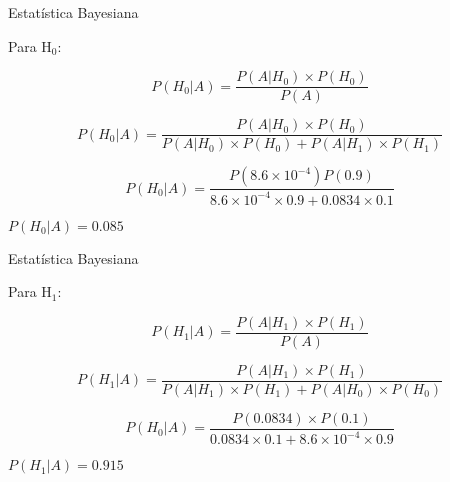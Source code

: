\documentclass{beamer}\usepackage[]{graphicx}\usepackage[]{color}
\begin{document}
\begin{frame}{Estatística Bayesiana}

Para H$_0$:

\begin{equation*}
P(H_0|A) = \frac{P(A|H_0) \times P(H_0)}{P(A)}
\end{equation*}

\begin{equation*}
P(H_0 | A) = \frac{P(A | H_0) \times P(H_0)}{P(A | H_0) \times P(H_0) + P(A | H_1) \times P(H_1)}
\end{equation*}

\begin{equation*}
P(H_0 | A) = \frac{P(\ensuremath{8.6\times 10^{-4}})P(0.9)}{\ensuremath{8.6\times 10^{-4}}\times 0.9 +0.0834 \times 0.1}
\end{equation*}

$P(H_0|A) = 0.085$
 
\end{frame}

\begin{frame}{Estatística Bayesiana}

Para H$_1$:

\begin{equation*}
P(H_1 | A) = \frac{P(A | H_1) \times P(H_1)}{P(A)}
\end{equation*}

\begin{equation*}
P(H_1 | A) = \frac{P(A | H_1) \times P(H_1)}{P(A | H_1) \times P(H_1) + P(A | H_0) \times P(H_0)}
\end{equation*}

\begin{equation*}
P(H_0 | A) = \frac{P(0.0834) \times P(0.1)}{0.0834 \times 0.1 +\ensuremath{8.6\times 10^{-4}} \times 0.9}
\end{equation*}

$P(H_1|A) = 0.915$
 
\end{frame}
\end{document}
